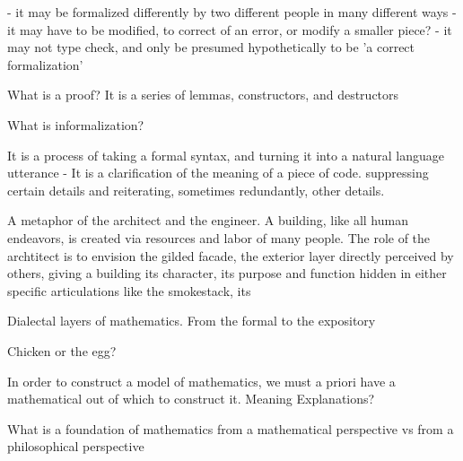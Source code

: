   - it may be formalized differently by two different people in many different ways
  - it may have to be modified, to correct of an error, or modify a smaller piece?
  - it may not type check, and only be presumed hypothetically to be 'a correct formalization'


  
What is a proof? It is a series of lemmas, constructors, and destructors

What is informalization? 

It is a process of taking a formal syntax, and turning it into a natural
language utterance -  It is a clarification of the meaning of a piece of
code. suppressing certain details and reiterating, sometimes
redundantly, other details.

A metaphor of the architect and the engineer.  A building, like all human
endeavors, is created via resources and labor of many people. The role of the archtitect
is to envision the gilded facade, the exterior layer directly perceived by
others, giving a building its character, its purpose and function hidden in
either specific articulations like the
smokestack,  its 

Dialectal layers of mathematics.  From the formal to the expository 

Chicken or the egg?

In order to construct a model of mathematics, we must a priori have a
mathematical out of which to construct it.  Meaning Explanations?

What is a foundation of mathematics from a mathematical perspective vs from a
philosophical perspective

